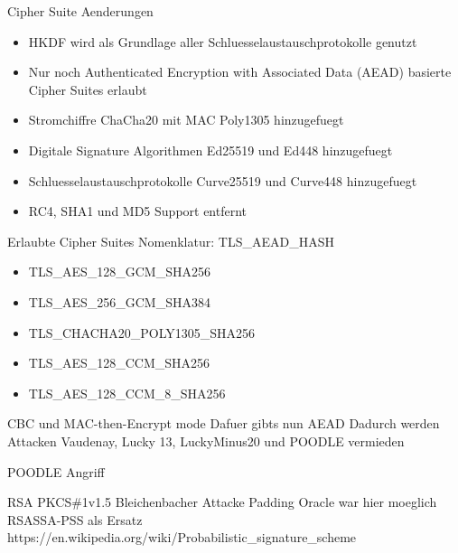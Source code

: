 \documentclass{f4_beamer_metropolis}
\begin{document}
\begin{frame}{Cipher Suite Aenderungen}
  \begin{itemize}
  \item HKDF wird als Grundlage aller Schluesselaustauschprotokolle genutzt
  \item Nur noch Authenticated Encryption with Associated Data (AEAD) basierte Cipher Suites erlaubt
  \item Stromchiffre ChaCha20 mit MAC Poly1305 hinzugefuegt
  \item Digitale Signature Algorithmen Ed25519 und Ed448 hinzugefuegt
  \item Schluesselaustauschprotokolle Curve25519 und Curve448 hinzugefuegt
  \item RC4, SHA1 und MD5 Support entfernt \autocite{rc4.nomore} \autocite{shattered}
\end{itemize}
\end{frame}

\begin{frame}{Erlaubte Cipher Suites}
Nomenklatur: TLS\_AEAD\_HASH
  \begin{itemize}
    \item TLS\_AES\_128\_GCM\_SHA256
    \item TLS\_AES\_256\_GCM\_SHA384
    \item TLS\_CHACHA20\_POLY1305\_SHA256
    \item TLS\_AES\_128\_CCM\_SHA256
    \item TLS\_AES\_128\_CCM\_8\_SHA256
  \end{itemize}
\end{frame}

\begin{frame}{CBC und MAC-then-Encrypt mode}
  Dafuer gibts nun AEAD
  Dadurch werden Attacken Vaudenay, Lucky 13, LuckyMinus20 und POODLE vermieden
\end{frame}

\begin{frame}{POODLE Angriff}
\end{frame}

\begin{frame}{RSA PKCS\#1v1.5}
  Bleichenbacher Attacke Padding Oracle war hier moeglich
  RSASSA-PSS als Ersatz
  https://en.wikipedia.org/wiki/Probabilistic_signature_scheme
\end{frame}
\end{document}
